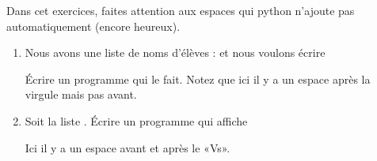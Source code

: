 
\begin{exercice}\label{exoPremiere-0051}

    Dans cet exercices, faites attention aux espaces qui python n'ajoute pas automatiquement (encore heureux).

    \begin{enumerate}
        \item
    Nous avons une liste de noms d'élèves :  et nous voulons écrire
    \begin{quote}
    \end{quote}
    Écrire un programme qui le fait. Notez que ici il y a un espace après la virgule mais pas avant.
\item

    Soit la liste . Écrire un programme qui affiche
    \begin{quote}
    \end{quote}
    Ici il y a un espace avant et après le  «Vs».
            
    \end{enumerate}

\end{exercice}
